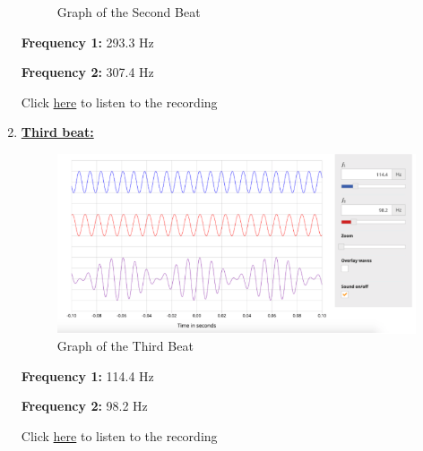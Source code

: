 \documentclass[12pt,oneside]{article}
\begin{document}
\begin{enumerate}
\begin{figure}[H]
{}

\caption{Graph of the Second Beat}\label{fig:beat2}
\end{figure}

\textbf{Frequency 1:} 293.3 Hz

\par

\textbf{Frequency 2:} 307.4 Hz

\par

Click
\href{https://drive.google.com/file/d/1oeeTuEsuQm12f_mGFPHBa7d3HnDYG668/view?usp=sharing}{here}
to listen to the recording

\color{black}
\item \underline{\bf Third beat:}
\color{red}

\begin{figure}[H]

{\centering \includegraphics[width=15cm,]{./images/beat3} 

}

\caption{Graph of the Third Beat}\label{fig:beat3}
\end{figure}

\textbf{Frequency 1:} 114.4 Hz

\par

\textbf{Frequency 2:} 98.2 Hz

\par

Click
\href{https://drive.google.com/file/d/1HDnGARGU-zLe6rnKFT0szBtuhRpNQbNN/view?usp=sharing}{here}
to listen to the recording

\color{black}
\end{enumerate}
\end{document}
